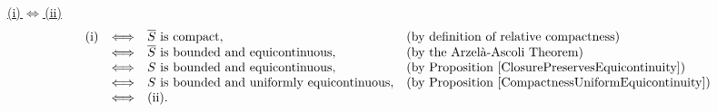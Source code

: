 \proof
\vskip 0.2cm
\noindent
\underline{(i)\,$\Longleftrightarrow$\,(ii)}
\vskip 0.1cm
\begin{equation*}
\begin{array}{ccll}
\textnormal{(i)}
&\Longleftrightarrow& \textnormal{$\overline{S}$ is compact}, & \textnormal{(by definition of relative compactness)}
\\
&\Longleftrightarrow& \textnormal{$\overline{S}$ is bounded and equicontinuous}, & \textnormal{(by the Arzel\`{a}-Ascoli Theorem)}
\\
&\Longleftrightarrow& \textnormal{$S$ is bounded and equicontinuous}, & \textnormal{(by Proposition \ref{ClosurePreservesEquicontinuity})}
\\
&\Longleftrightarrow& \textnormal{$S$ is bounded and uniformly equicontinuous}, & \textnormal{(by Proposition \ref{CompactnessUniformEquicontinuity})}
\\
&\Longleftrightarrow& \textnormal{(ii)}.
\end{array}
\end{equation*}

